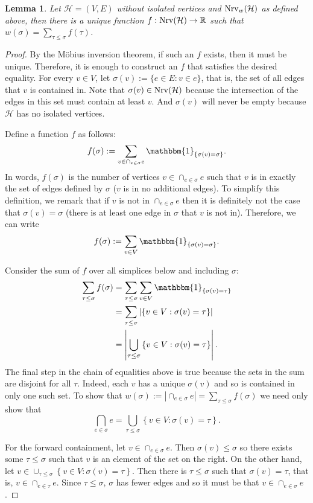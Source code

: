 \documentclass{amsart}
\newtheorem{lemma}[theorem]{Lemma}
\newcommand{\R}{\mathbb{R}}
\renewcommand{\H}{\mathcal{H}}
\newcommand{\Nrv}{\mm{\mathrm{Nrv}}}
\newcommand {\mm}[1]        {\ifmmode{#1}\else{\mbox{\(#1\)}}\fi}
\begin{document}
\begin{lemma}\label{lem:unique_f}
    Let $\H=(V, E)$ without isolated vertices and $\Nrv_w(\H)$ as defined above, then there is a unique function $f : \Nrv(\H) \rightarrow \R$ such that $w(\sigma) = \sum_{\tau \leq \sigma} f(\tau)$.
\end{lemma}
\begin{proof}
    By the M\"obius inversion theorem, if such an $f$ exists, then it must be unique. Therefore, it is enough to construct an $f$ that satisfies the desired equality. For every $v \in V$, let $\sigma(v) := \{e \in E : v \in e\}$, that is, the set of all edges that $v$ is contained in. Note that $\sigma(v) \in \Nrv(\H)$ because the intersection of the edges in this set must contain at least $v$. And $\sigma(v)$ will never be empty because $\H$ has no isolated vertices. 
    
    Define a function $f$ as follows:
    \[ f(\sigma) := \sum_{v \in \cap_{e \in \sigma} e} \mathbbm{1}_{\{ \sigma(v) = \sigma \}}. \]
    In words, $f(\sigma)$ is the number of vertices $v \in \cap_{e \in \sigma} e$ such that $v$ is in exactly the set of edges defined by $\sigma$ ($v$ is in no additional edges).
    To simplify this definition, we remark that if $v$ is not in $\cap_{e \in \sigma} e$ then it is definitely not the case that $\sigma(v)=\sigma$ (there is at least one edge in $\sigma$ that $v$ is not in). Therefore, we can write
    \[ f(\sigma) := \sum_{v \in V} \mathbbm{1}_{\{ \sigma(v) = \sigma \}}. \]
    
    Consider the sum of $f$ over all simplices below and including $\sigma$:
    \begin{align*}
        \sum_{\tau \leq \sigma} f(\sigma) &= \sum_{\tau \leq \sigma} \sum_{v \in V} \mathbbm{1}_{\{\sigma(v) = \tau\}}\\
        &= \sum_{\tau \leq \sigma} \left| \left\{ v \in V: \sigma(v) = \tau \right\} \right|\\
        &= \left| \bigcup_{\tau \leq \sigma} \left\{ v \in V : \sigma(v) = \tau \right\} \right|.
    \end{align*}
    The final step in the chain of equalities above is true because the sets in the sum are disjoint for all $\tau$. Indeed, each $v$ has a unique $\sigma(v)$ and so is contained in only one such set. To show that $w(\sigma) := |\cap_{e \in \sigma} e| = \sum_{\tau \leq \sigma} f(\sigma)$ we need only show that 
    \[\bigcap_{e \in \sigma} e = \bigcup_{\tau \leq \sigma} \left\{ v \in V : \sigma(v) = \tau \right\}.\]

    For the forward containment, let $v \in \cap_{e \in \sigma} e$. Then $\sigma(v) \leq \sigma$ so there exists some $\tau \leq \sigma$ such that $v$ is an element of the set on the right.  On the other hand, let $v \in \cup_{\tau \leq \sigma} \left\{ v \in V : \sigma(v) = \tau \right\}$. Then there is $\tau \leq \sigma$ such that $\sigma(v) = \tau$, that is, $v \in \cap_{e \in \tau} e$. Since $\tau \leq \sigma$, $\sigma$ has fewer edges and so it must be that $v \in \cap_{e \in \sigma} e$.
\end{proof}
\end{document}
